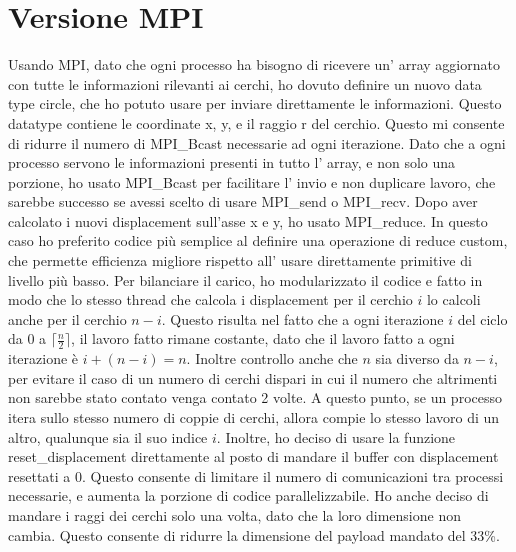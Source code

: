 \documentclass[a4paper,11pt, twoside]{report}
\begin{document}
\section*{Versione MPI}
Usando MPI, dato che ogni processo ha bisogno di ricevere un' array aggiornato con tutte le informazioni rilevanti ai cerchi,
ho dovuto definire un nuovo data type circle, che ho potuto usare per inviare direttamente le informazioni.
Questo datatype contiene le coordinate x, y, e il raggio r del cerchio. %
Questo mi consente di ridurre il numero di MPI\_Bcast necessarie ad ogni iterazione.
Dato che a ogni processo servono le informazioni presenti in tutto l' array, e non solo una porzione, ho usato MPI\_Bcast per facilitare l' invio e non duplicare lavoro,
che sarebbe successo se avessi scelto di usare MPI\_send o  MPI\_recv.
Dopo aver calcolato i nuovi displacement sull'asse x e y, ho usato MPI\_reduce.
In questo caso ho preferito codice più semplice al definire una operazione di reduce custom,
che permette efficienza migliore rispetto all' usare direttamente primitive di livello più basso.
Per bilanciare il carico, ho modularizzato il codice e fatto in modo che lo stesso thread che calcola i displacement per il cerchio $i$ lo calcoli anche per il cerchio $n-i$.
Questo risulta nel fatto che a ogni iterazione $i$ del ciclo da $0$ a $\lceil \frac{n}{2} \rceil$, il lavoro fatto rimane costante, dato che il lavoro fatto a ogni iterazione è $i + (n-i) = n$.
Inoltre controllo anche che $n$ sia diverso da $n-i$, per evitare il caso di un numero di cerchi dispari in cui il numero che altrimenti non sarebbe stato contato venga contato 2 volte.
A questo punto, se un processo itera sullo stesso numero di coppie di cerchi, allora compie lo stesso lavoro di un altro, qualunque sia il suo indice $i$.
Inoltre, ho deciso di usare la funzione reset\_displacement direttamente al posto di mandare il buffer con displacement resettati a 0.
Questo consente di limitare il numero di comunicazioni tra processi necessarie, e aumenta la porzione di codice parallelizzabile.
Ho anche deciso di mandare i raggi dei cerchi solo una volta, dato che la loro dimensione non cambia.
Questo consente di ridurre la dimensione del payload mandato del 33\%.
\end{document}
